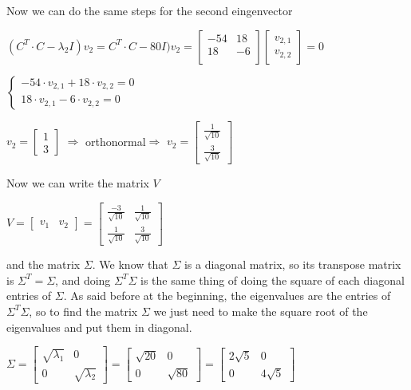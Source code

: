 Now we can do the same steps for the second eingenvector
\begin{center}
		$  (C^T \cdot C-\lambda_2 I)v_2= C^T \cdot C-80 I) v_2= \begin{bmatrix}
		-54 &   18 \\
		18  &  -6\\
	\end{bmatrix}\begin{bmatrix}v_{2,1}\\v_{2,2}\end{bmatrix}=0  $
\end{center}
\begin{center}
	
	$ \begin{cases} -54\cdot v_{2,1}+18 \cdot v_{2,2}=0 \\
	18\cdot v_{2,1} -6 \cdot v_{2,2}=0 \end{cases} $
\end{center}
\begin{center}
	$  v_2=\begin{bmatrix}
	1\\
	3
	\end{bmatrix}$ $ \Longrightarrow $ orthonormal$ \Longrightarrow $ $v_2=\begin{bmatrix}
	\frac{1}{\sqrt{10}}\\
	\frac{3}{\sqrt{10}}
	\end{bmatrix}  $
\end{center}
Now we can write the matrix $ V $
\begin{center}
	$ V=\begin{bmatrix}
	v_1 & v_2
	\end{bmatrix}=\begin{bmatrix}
	\frac{-3}{\sqrt{10}} & \frac{1}{\sqrt{10}}\\
	\frac{1}{\sqrt{10}} &	\frac{3}{\sqrt{10}}
	\end{bmatrix} $
\end{center}
and the matrix $ \Sigma $. We know that  $ \Sigma $ is a diagonal matrix, so its transpose matrix is $ \Sigma^T= \Sigma  $, and doing $\Sigma^T \Sigma$ is the same thing of doing the square of each diagonal entries of $\Sigma$.
As said before at the beginning, the eigenvalues are the entries of $\Sigma^T \Sigma$, so to find the matrix $\Sigma$ we just need to make the square root of the eigenvalues and put them in diagonal.
\begin{center}
	$ \Sigma=\begin{bmatrix}
	\sqrt{\lambda_1} & 0\\
	0 & \sqrt{\lambda_2}
	\end{bmatrix}=\begin{bmatrix}
		\sqrt{20} & 0\\
		0 & \sqrt{80}
	\end{bmatrix}=\begin{bmatrix}
	2\sqrt{5} & 0\\
	0 & 4\sqrt{5}
	\end{bmatrix} $
\end{center}
